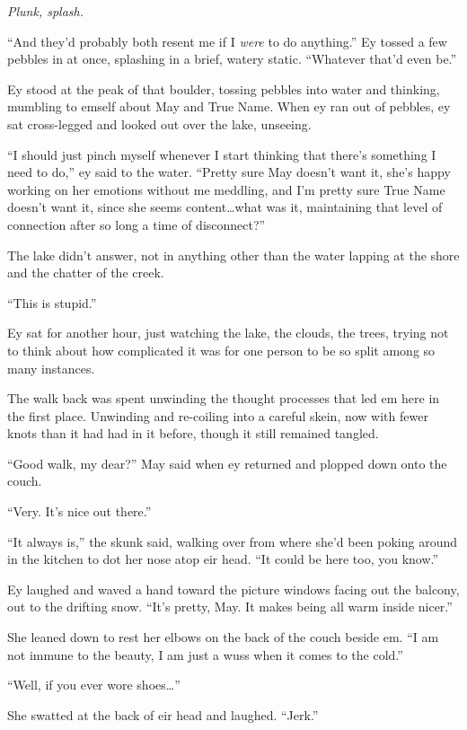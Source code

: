 \emph{Plunk, splash.}

``And they'd probably both resent me if I \emph{were} to do anything.'' Ey tossed a few pebbles in at once, splashing in a brief, watery static. ``Whatever that'd even be.''

Ey stood at the peak of that boulder, tossing pebbles into water and thinking, mumbling to emself about May and True Name. When ey ran out of pebbles, ey sat cross-legged and looked out over the lake, unseeing.

``I should just pinch myself whenever I start thinking that there's something I need to do,'' ey said to the water. ``Pretty sure May doesn't want it, she's happy working on her emotions without me meddling, and I'm pretty sure True Name doesn't want it, since she seems content\ldots what was it, maintaining that level of connection after so long a time of disconnect?''

The lake didn't answer, not in anything other than the water lapping at the shore and the chatter of the creek.

``This is stupid.''

Ey sat for another hour, just watching the lake, the clouds, the trees, trying not to think about how complicated it was for one person to be so split among so many instances.

The walk back was spent unwinding the thought processes that led em here in the first place. Unwinding and re-coiling into a careful skein, now with fewer knots than it had had in it before, though it still remained tangled.

``Good walk, my dear?'' May said when ey returned and plopped down onto the couch.

``Very. It's nice out there.''

``It always is,'' the skunk said, walking over from where she'd been poking around in the kitchen to dot her nose atop eir head. ``It could be here too, you know.''

Ey laughed and waved a hand toward the picture windows facing out the balcony, out to the drifting snow. ``It's pretty, May. It makes being all warm inside nicer.''

She leaned down to rest her elbows on the back of the couch beside em. ``I am not immune to the beauty, I am just a wuss when it comes to the cold.''

``Well, if you ever wore shoes\ldots{}''

She swatted at the back of eir head and laughed. ``Jerk.''

